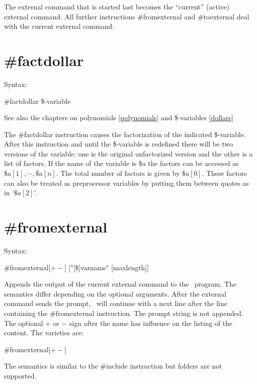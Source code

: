 The external command that is started last becomes the ``current'' (active) 
external command.  All further instructions 
\#fromexternal and \#toexternal 
deal with the current external command.


\section{\#factdollar}
\label{prefactdollar}

\noindent Syntax:

\#factdollar \$-variable
 
\noindent See also the chapters on polynomials \ref{polynomials} and 
\$-variables \ref{dollars}

\noindent The \#factdollar instruction causes the 
factorization of the indicated \$-variable. After this instruction and 
until the \$-variable is redefined there will be two versions of the 
variable: one is the original unfactorized version and the other is a list 
of factors. If the name of the variable is \$a the factors can be accessed 
as $\$a[1],\cdots,\$a[n]$. The total number of factors is given by 
$\$a[0]$. These factors can also be treated as preprocessor variables by 
putting them between quotes as in `$\$a[2]$'.


\section{\#fromexternal}
\label{prefromexternal}

\noindent Syntax:

\#fromexternal[$+-$] ["[\$]varname" [maxlength]]

\noindent Appends the output of the current external 
command to the \FORM\ program. The semantics differ depending on the optional 
arguments. After the external command sends the prompt, \FORM\ 
will continue with a next line after the line containing the \#fromexternal 
instruction. The prompt string is not appended. The optional $+$ or $-$ sign 
after the name has influence on the listing of the content. The varieties 
are:
                                                           
\#fromexternal[$+-$]

\noindent The semantics is similar to the \#include 
instruction but folders are not supported. 

